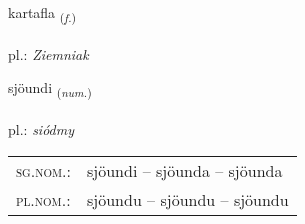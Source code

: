 \documentclass[frontgrid, backgrid]{flacards}\usepackage[]{graphicx}\usepackage[]{xcolor}
\begin{document}
\renewcommand{\flhead}{\vskip5pt \fboxsep=0pt {\small\bfseries\footnotesize Nafnorð | rzeczownik}}
\renewcommand{\fcfoot}{\vskip5pt \fboxsep=0pt \hspace{2pt}{\small\bfseries\footnotesize 3K}}

\renewcommand{\blhead}{\vskip5pt {\small\bfseries\footnotesize Nafnorð | rzeczownik }}
\renewcommand{\bcfoot}{\vskip5pt \hspace{2pt}{\small\bfseries\footnotesize 3K}}


{kartafla \small{\textsubscript{(\textit{f.})}} \\[1ex] %
 \\
pl.: \emph{Ziemniak} \\  [2ex]
\renewcommand*{\arraystretch}{0.8}
}

\renewcommand{\flhead}{\vskip5pt \fboxsep=0pt {\small\bfseries\footnotesize Töluorð | liczebnik}}
\renewcommand{\fcfoot}{\vskip5pt \fboxsep=0pt \hspace{2pt}{\small\bfseries\footnotesize 3K}}

\renewcommand{\blhead}{\vskip5pt {\small\bfseries\footnotesize Töluorð | liczebnik }}
\renewcommand{\bcfoot}{\vskip5pt \hspace{2pt}{\small\bfseries\footnotesize 3K}}


{sjöundi \small{\textsubscript{(\textit{num.})}} \\[1ex] %
\textphonetic{[sjœːʏntɪ]} \\
pl.: \emph{siódmy} \\  [2ex]
\renewcommand*{\arraystretch}{0.8}
\begin{tabular}{ll}
\textsc{sg.nom.}: & sjöundi  --  sjöunda -- sjöunda \\ 
\textsc{pl.nom.}: & sjöundu -- sjöundu -- sjöundu
\end{tabular}
}
\end{document}
